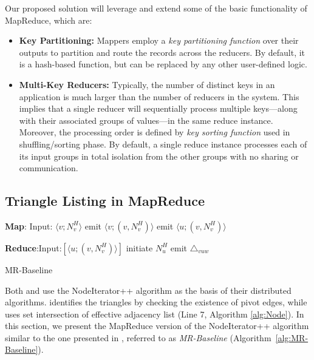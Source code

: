 Our proposed solution will leverage and extend some of the basic functionality of MapReduce, which are:
\begin{itemize}
\item {{\bf Key Partitioning:} 
        Mappers employ a \emph{key partitioning function} over their outputs to partition and route the records across the reducers. 
        By default, it is a hash-based function, but can be replaced by any other user-defined logic. 
}
\item {{\bf Multi-Key Reducers:} 
    Typically, the number of distinct keys in an application is much larger than the number of reducers in the system. 
    This implies that a single reducer will sequentially process multiple keys---along with their associated groups of values---in the same reduce instance. 
      Moreover, the processing order is defined by \emph{key sorting function} used in shuffling/sorting phase. 
    By default, a single reduce instance processes each of its input groups in total isolation from the other groups with no sharing or communication. 
 }  
\end{itemize}

\subsection{Triangle Listing in MapReduce}
\label{sec:MR_baseline}
\begin{algorithm}[t]
    \begin{algorithmic}[1]
                \item[] {\textbf{Map}: Input: $\langle v;N_v^H \rangle$}
                \STATE emit $\langle v;(v,N_v^H) \rangle$
                    \STATE emit $\langle u;(v,N_v^H) \rangle$
                \ENDFOR
                \item[]
                \item[]\textbf{Reduce}:Input:$[ \langle u;(v,N_v^H) \rangle ]$ 
                \STATE initiate $N_u^H$  
                        \STATE emit $\triangle_{vuw}$
                    \ENDFOR
                \ENDFOR
                 \caption{MR-Baseline}
                \label{alg:MR-Baseline}
      \end{algorithmic}
\end{algorithm}
Both \cite{Suri_Vassilvitskii_2011} and \cite{Patric} use the NodeIterator++ algorithm as the basis of their distributed algorithms.\cite{Suri_Vassilvitskii_2011} identifies the triangles by checking the existence of pivot edges, while \cite{Patric} uses set intersection of effective adjacency list (Line 7, Algorithm \ref{alg:Node}). In this section, we present the MapReduce version of the NodeIterator++ algorithm similar to the one presented  in \cite{Patric},  
referred to as {\em MR-Baseline} (Algorithm~\ref{alg:MR-Baseline}). 

